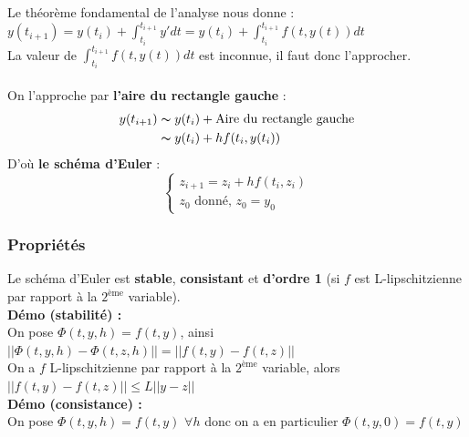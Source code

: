 \documentclass[a4paper,10pt]{report}
\begin{document}
\begin{minipage}{.53\linewidth}
\noindent Le théorème fondamental de l'analyse nous donne : $y(t_{i+1}) = y(t_i) + \int_{t_i}^{t_{i+1}} y'dt = y(t_i) + \int_{t_i}^{t_{i+1}} f(t,y(t))dt$\\
La valeur de $\int_{t_i}^{t_{i+1}} f(t,y(t))dt$ est inconnue, il faut donc l'approcher.\\ \\
On l'approche par \textbf{l'aire du rectangle gauche} :
\abovedisplayskip=0mm
\begin{align*}
   y(t_{i+1}) & \thicksim y(t_i)+ \text{Aire du rectangle gauche} \\
			  & \thicksim y(t_i)+ hf(t_i,y(t_i))
\end{align*}
D'où \textbf{le schéma d'Euler} :
\begin{equation}
\left\lbrace
\begin{array}{l}
z_{i+1}=z_i+hf(t_i,z_i) \\
z_0 \text{ donné, } z_0=y_0
\end{array}\right.
\end{equation}
\end{minipage}

\subsubsection{Propriétés}
\noindent Le schéma d'Euler est \textbf{stable}, \textbf{consistant} et \textbf{d'ordre 1} (si $f$ est L-lipschitzienne par rapport à la $2^{\text{ème}}$ variable).  \\

\textbf{Démo (stabilité) :}\\
\indent On pose $\Phi(t,y,h)=f(t,y)$, ainsi $||\Phi(t,y,h)-\Phi(t,z,h)|| = ||f(t,y)-f(t,z)||$\\
\indent On a $f$ L-lipschitzienne par rapport à la $2^{\text{ème}}$ variable, alors $||f(t,y)-f(t,z)||\leq L||y-z||$\\

\textbf{Démo (consistance) :}\\
\indent On pose $\Phi(t,y,h)=f(t,y)$ $\forall h$ donc on a en particulier $\Phi(t,y,0)=f(t,y)$\\
\end{document}
